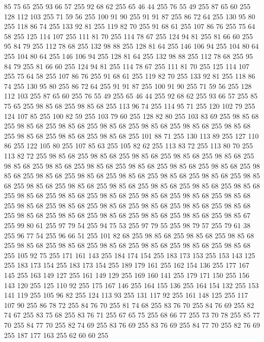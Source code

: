 85 75 65 255 93 66 57 255 92 68 62 255 65 46 44 255 76 55 49 255 87 65 60 255 128 112 103 255 71 59 56 255 100 91 90 255 91 91 87 255 86 72 64 255 130 95 80 255 118 86 74 255 133 92 81 255 119 82 70 255 91 68 61 255 107 86 76 255 75 64 58 255 125 114 107 255 111 81 70 255 114 78 67 255 124 94 81 255 81 66 60 255 95 84 79 255 112 78 68 255 132 98 88 255 128 81 64 255 146 106 94 255 104 80 64 255 104 80 64 255 146 106 94 255 128 81 64 255 132 98 88 255 112 78 68 255 95 84 79 255 81 66 60 255 124 94 81 255 114 78 67 255 111 81 70 255 125 114 107 255 75 64 58 255 107 86 76 255 91 68 61 255 119 82 70 255 133 92 81 255 118 86 74 255 130 95 80 255 86 72 64 255 91 91 87 255 100 91 90 255 71 59 56 255 128 112 103 255 87 65 60 255 76 55 49 255 65 46 44 255 92 68 62 255 93 66 57 255 85 75 65 255 98 85 68 255 98 85 68 255 113 96 74 255 114 95 71 255 120 102 79 255 124 107 85 255
100 82 59 255 103 79 60 255 128 82 80 255 103 83 69 255 98 85 68 255 98 85 68 255 98 85 68 255 98 85 68 255 98 85 68 255 98 85 68 255 98 85 68 255 98 85 68 255 98 85 68 255 98 85 68 255 101 88 71 255 130 113 89 255 127 110 86 255 122 105 80 255 107 85 63 255 105 82 62 255 113 83 72 255 113 80 70 255 113 82 72 255 98 85 68 255 98 85 68 255 98 85 68 255 98 85 68 255 98 85 68 255 98 85 68 255 98 85 68 255 98 85 68 255 98 85 68 255 98 85 68 255 98 85 68 255 98 85 68 255 98 85 68 255 98 85 68 255 98 85 68 255 98 85 68 255 98 85 68 255 98 85 68 255 98 85 68 255 98 85 68 255 98 85 68 255 98 85 68 255 98 85 68 255 98 85 68 255 98 85 68 255 98 85 68 255 98 85 68 255 98 85 68 255 98 85 68 255 98 85 68 255 98 85 68 255 98 85 68 255 98 85 68 255 98 85 68 255 98 85 68 255 98 85 68 255 98 85 68 255 98 85 68 255 98 85 68 255 98 85 68 255 98 85 68 255
98 85 67 255 99 80 61 255 97 79 54 255 94 75 53 255 97 79 55 255 98 79 57 255 79 61 38 255 96 77 54 255 96 66 51 255 101 82 68 255 98 85 68 255 98 85 68 255 98 85 68 255 98 85 68 255 98 85 68 255 98 85 68 255 98 85 68 255 98 85 68 255 98 85 68 255 105 92 75 255 171 161 143 255 184 174 154 255 183 173 153 255 153 143 125 255 183 173 154 255 183 173 154 255 189 179 161 255 162 154 136 255 177 167 145 255 163 149 127 255 161 149 129 255 169 160 141 255 179 171 150 255 156 143 120 255 125 110 92 255 175 167 146 255 164 155 136 255 164 154 132 255 153 141 119 255 105 96 82 255 124 113 93 255 131 117 92 255 161 148 125 255 117 107 90 255 86 78 72 255 84 76 70 255 81 74 68 255 83 76 70 255 84 76 69 255 82 74 67 255 83 75 68 255 83 76 71 255 67 65 75 255 68 66 77 255 73 70 78 255 85 77 70 255 84 77 70 255 82 74 69 255 83 76 69 255 83 76 69 255 84 77 70 255 82 76 69 255 187 177 163 255 62 60 60 255
